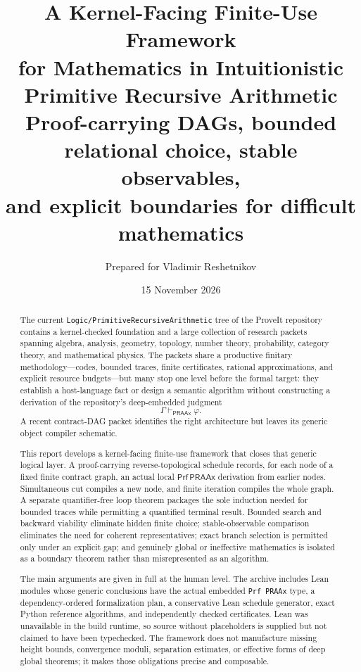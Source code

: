 \documentclass[11pt]{article}
\title{\bfseries A Kernel-Facing Finite-Use Framework\\
for Mathematics in Intuitionistic Primitive Recursive Arithmetic\\[0.4em]
\large Proof-carrying DAGs, bounded relational choice, stable observables,\\
and explicit boundaries for difficult mathematics}
\author{Prepared for Vladimir Reshetnikov}
\date{15 November 2026}
\newcommand{\PRAAx}{\mathsf{PRAAx}}
\newcommand{\Prf}{\mathsf{Prf}}
\begin{document}
\maketitle

\begin{abstract}
The current \texttt{Logic/PrimitiveRecursiveArithmetic} tree of the ProveIt
repository contains a kernel-checked foundation and a large collection of
research packets spanning algebra, analysis, geometry, topology, number
theory, probability, category theory, and mathematical physics.  The packets
share a productive finitary methodology---codes, bounded traces, finite
certificates, rational approximations, and explicit resource budgets---but
many stop one level before the formal target: they establish a host-language
fact or design a semantic algorithm without constructing a derivation of the
repository's deep-embedded judgment
\[
  \Gamma\vdash_{\PRAAx}\varphi.
\]
A recent contract-DAG packet identifies the right architecture but leaves its
generic object compiler schematic.

This report develops a kernel-facing finite-use framework that closes that
generic logical layer.  A proof-carrying reverse-topological schedule records,
for each node of a fixed finite contract graph, an actual local
\(\Prf\,\PRAAx\) derivation from earlier nodes.  Simultaneous cut compiles a new
node, and finite iteration compiles the whole graph.  A separate
quantifier-free loop theorem packages the sole induction needed for bounded
traces while permitting a quantified terminal result.  Bounded search and
backward viability eliminate hidden finite choice; stable-observable
comparison eliminates the need for coherent representatives; exact branch
selection is permitted only under an explicit gap; and genuinely global or
ineffective mathematics is isolated as a boundary theorem rather than
misrepresented as an algorithm.

The main arguments are given in full at the human level.  The archive includes
Lean modules whose generic conclusions have the actual embedded
\texttt{Prf PRAAx} type, a dependency-ordered formalization plan, a conservative
Lean schedule generator, exact Python reference algorithms, and independently
checked certificates.  Lean was unavailable in the build runtime, so source
without placeholders is supplied but not claimed to have been typechecked.
The framework does not manufacture missing height bounds, convergence moduli,
separation estimates, or effective forms of deep global theorems; it makes
those obligations precise and composable.
\end{abstract}
\end{document}
